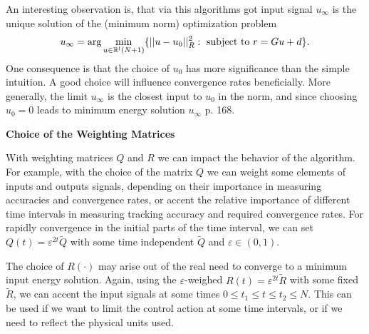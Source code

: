 An interesting observation is, that via this algorithms got input signal $u_\infty$ is the unique solution of the (minimum norm) optimization problem 
\begin{align}
u_\infty = \arg \min_{u \in {\mathbb{R}}^l(N+1)} \{|| u - u_0||_R^2: \text{ subject to } r = Gu + d\}.
\end{align}
One consequence is that the choice of $u_0$ has more significance than the simple intuition. A good choice will influence convergence rates beneficially. More generally, the limit $u_\infty$ is the closest input to $u_0$ in the norm, and since choosing $u_0 = 0$ leads to minimum energy solution $u_\infty$ \cite{ILC} p. 168. 

\textbf{Choice of the Weighting Matrices}

With weighting matrices $Q$ and $R$ we can impact the behavior of the algorithm. For example, with the choice of the matrix $Q$ we can weight some elements of inputs and outputs signals, depending on their importance in measuring accuracies and convergence rates, or accent the relative importance of different time intervals in measuring tracking accuracy and required convergence rates. For rapidly convergence in the initial parts of the time interval, we can set $Q(t) = \varepsilon^{2t}\tilde{Q}$ with some time independent $\tilde{Q}$ and $\varepsilon \in (0,1)$. 

The choice of $R(\cdot)$ may arise out of the real need to converge to a minimum input energy solution. 
Again, using the $\varepsilon$-weighed $R(t) = \varepsilon^{2t}\tilde{R}$ with some fixed $\tilde{R}$, we can accent the input signals at some times $0\leq t_1 \leq t \leq t_2 \leq N$. This can be used if we want to limit the control action at some time intervals, or if we need to reflect the physical units used. 

%
%
%
%





